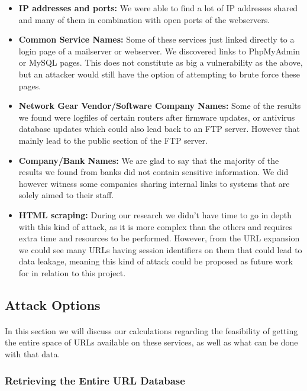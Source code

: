 \documentclass[12pt]{article}
\begin{document}
\begin{itemize}
\item \textbf{IP addresses and ports:}  We were able to find a lot of IP addresses shared and many of them in combination with open ports of the webservers.

\item \textbf{Common Service Names:} Some of these services just linked directly to a login page of a mailserver or webserver. We discovered links to PhpMyAdmin or MySQL pages. This does not constitute as big a vulnerability as the above, but an attacker would still have the option of attempting to brute force these pages.

\item \textbf{Network Gear Vendor/Software Company Names:} Some of the results we found were logfiles of certain routers after firmware updates, or antivirus database updates which could also lead back to an FTP server. However that mainly lead to the public section of the FTP server.

\item \textbf{Company/Bank Names:} We are glad to say that the majority of the results we found from banks did not contain sensitive information. We did however witness some companies sharing internal links to systems that are solely aimed to their staff.

\item \textbf{HTML scraping:} During our research we didn't have time to go in depth with this kind of attack, as it is more complex than the others and requires extra time and resources to be performed. However, from the URL expansion we could see many URLs having session identifiers on them that could lead to data leakage, meaning this kind of attack could be proposed as future work for in relation to this project.

\end{itemize}

\subsection{Attack Options}

\paragraph{}
In this section we will discuss our calculations regarding the feasibility of getting the entire space of URLs available on these services, as well as what can be done with that data.

\subsubsection{Retrieving the Entire URL Database}
\end{document}
